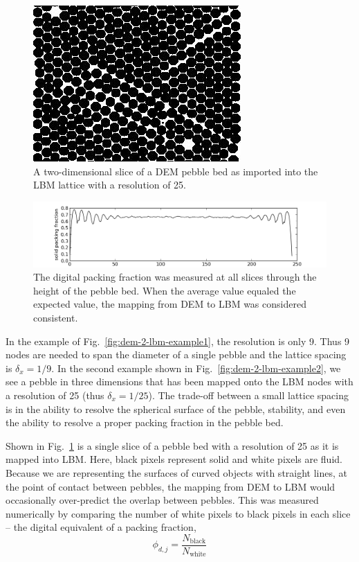 \begin{figure}[ht]
	\centering
	\includegraphics[width=\doubleimagewidth]{figures/lbm/crossSection0024.jpg}
	\caption{A two-dimensional slice of a DEM pebble bed as imported into the LBM lattice with a resolution of 25.}\label{fig:dem-2-lbm-example3}
\end{figure}
\begin{figure}[ht]
	\centering
	\includegraphics[width=\textwidth]{figures/lbm/palabos_packing_fraction}
	\caption{The digital packing fraction was measured at all slices through the height of the pebble bed. When the average value equaled the expected value, the mapping from DEM to LBM was considered consistent.}\label{fig:dem-2-lbm-packing-fraction}
\end{figure}

In the example of Fig.~\ref{fig:dem-2-lbm-example1}, the resolution is only 9. Thus 9 nodes are needed to span the diameter of a single pebble and the lattice spacing is $\delta_x = 1/9$. In the second example shown in Fig.~\ref{fig:dem-2-lbm-example2}, we see a pebble in three dimensions that has been mapped onto the LBM nodes with a resolution of 25 (thus $\delta_x = 1/25$). The trade-off between a small lattice spacing is in the ability to resolve the spherical surface of the pebble, stability, and even the ability to resolve a proper packing fraction in the pebble bed. 

Shown in Fig.~\ref{fig:dem-2-lbm-example3} is a single slice of a pebble bed with a resolution of 25 as it is mapped into LBM. Here, black pixels represent solid and white pixels are fluid. Because we are representing the surfaces of curved objects with straight lines, at the point of contact between pebbles, the mapping from DEM to LBM would occasionally over-predict the overlap between pebbles. This was measured numerically by comparing the number of white pixels to black pixels in each slice -- the digital equivalent of a packing fraction,
\begin{equation}
	\phi_{d,j} = \frac{N_\text{black}}{N_\text{white}}
\end{equation}

